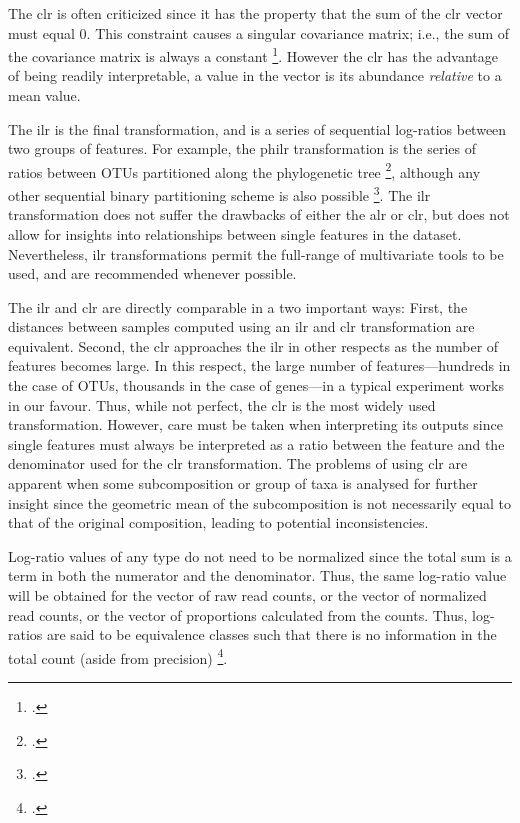 The clr is often criticized since it has the property that the sum of the clr vector must equal 0. This constraint causes a singular covariance matrix; i.e., the sum of the covariance matrix is always a constant \footcite{pawlowsky2015modeling}. However the clr has the advantage of being readily interpretable, a value in the vector is its abundance \emph{relative} to a mean value.

The ilr is the final transformation, and is a series of sequential log-ratios between two groups of features. For example, the philr transformation is the series of ratios between OTUs partitioned along the phylogenetic tree \footcite{Silverman:2017aa}, although any other sequential binary partitioning  scheme is also possible \footcite{pawlowsky2015modeling}. The ilr transformation does not suffer the drawbacks of either the alr or clr, but does not allow for insights into relationships between single features in the dataset.  Nevertheless, ilr transformations permit the full-range of multivariate tools to be used, and are recommended whenever possible.

The ilr and clr are directly comparable in a two important ways: First, the distances between samples computed using an ilr and clr transformation are equivalent. Second, the clr approaches the ilr in other respects as the number of features becomes large. In this respect, the large number of features---hundreds in the case of OTUs, thousands in the case of genes---in a typical experiment works in our favour. Thus, while not perfect, the clr is the most widely used transformation. However, care must be taken when interpreting its outputs since single features must always be interpreted as a ratio between the feature and the denominator used for the clr transformation. The problems of using clr are apparent  when some subcomposition or group of taxa is analysed for further insight since the geometric mean of the subcomposition is not necessarily equal to that of the original composition, leading to potential inconsistencies.

Log-ratio values of any type do not need to be normalized since the total sum is a term in both the numerator and the denominator. Thus, the same log-ratio value will be obtained for the vector of raw read counts, or the vector of normalized read counts, or the vector of proportions calculated from the counts. Thus, log-ratios are said to be equivalence classes such that there is no information in the total count (aside from precision) \footcite{barcelo:2001}. 

